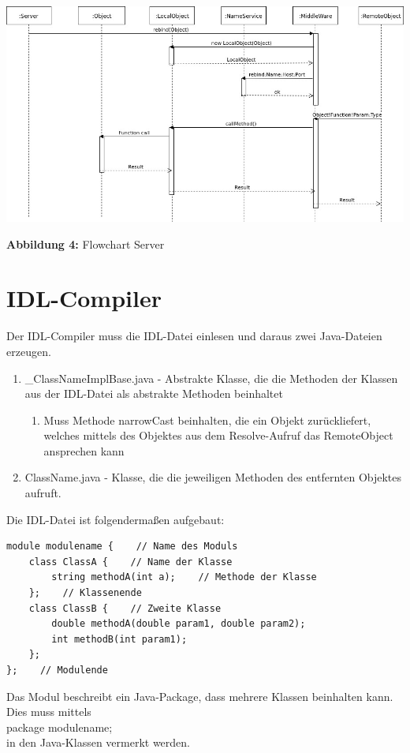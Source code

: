 \includegraphics[scale=0.5]{../pictures/ServerFlowChart.jpg}\\
\centerline{\textbf{Abbildung 4:} Flowchart Server}

\section{IDL-Compiler}
Der IDL-Compiler muss die IDL-Datei einlesen und daraus zwei Java-Dateien erzeugen.
\begin{enumerate}
\item \_ClassNameImplBase.java - Abstrakte Klasse, die die Methoden der Klassen aus der IDL-Datei als abstrakte Methoden beinhaltet
\begin{enumerate}
\item Muss Methode narrowCast beinhalten, die ein Objekt zurückliefert, welches mittels des Objektes aus dem Resolve-Aufruf das RemoteObject ansprechen kann
\end{enumerate}
\item ClassName.java - Klasse, die die jeweiligen Methoden des entfernten Objektes aufruft.
\end{enumerate}
Die IDL-Datei ist folgendermaßen aufgebaut:
\begin{lstlisting}
module modulename {    // Name des Moduls
	class ClassA {    // Name der Klasse
		string methodA(int a);    // Methode der Klasse
	};    // Klassenende
	class ClassB {    // Zweite Klasse
		double methodA(double param1, double param2);
		int methodB(int param1);
	};
};    // Modulende
\end{lstlisting}

Das Modul beschreibt ein Java-Package, dass mehrere Klassen beinhalten kann. Dies muss mittels \\
package modulename;\\
in den Java-Klassen vermerkt werden.

